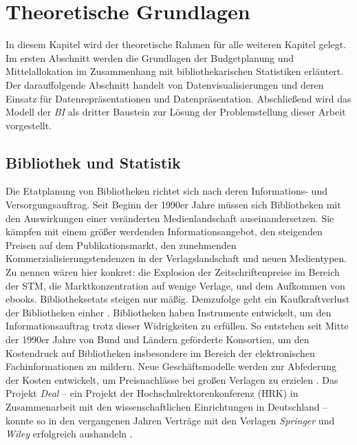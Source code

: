\chapter{Theoretische Grundlagen}
\label{chap:two}
In diesem Kapitel wird der theoretische Rahmen für alle weiteren Kapitel gelegt. Im
ersten Abschnitt werden die Grundlagen der Budgetplanung und Mittelallokation im Zusammenhang mit bibliothekarischen Statistiken erläutert. 
Der darauffolgende Abschnitt handelt von Datenvisualisierungen und deren Einsatz
für Datenrepräsentationen und Datenpräsentation. Abschließend wird das Modell der \textit{\acrlong{BI}} als dritter Baustein zur Lösung der 
Problemstellung dieser Arbeit vorgestellt.

\section{Bibliothek und Statistik}
\label{chap:two_one}
Die Etatplanung von Bibliotheken richtet sich nach deren Informations- und Versorgungsauftrag. 
Seit Beginn der 1990er Jahre müssen sich Bibliotheken mit den Auswirkungen einer veränderten Medienlandschaft auseinandersetzen.
Sie kämpfen mit einem größer werdenden Informationsangebot, den steigenden Preisen auf dem Publikationsmarkt, 
den zunehmenden Kommerzialisierungstendenzen in der Verlagslandschaft und neuen Medientypen. 
Zu nennen wären hier konkret: die Explosion der Zeitschriftenpreise im Bereich der \acrfull{STM}, die Marktkonzentration auf wenige Verlage, 
und dem Aufkommen von ebooks. Bibliotheksetats steigen nur mäßig. 
Demzufolge geht ein Kaufkraftverlust der Bibliotheken einher \cite[vgl.][164 ff.]{moravetz-kuhlmann_monika_erwerbungspolitik_2015}.
Bibliotheken haben Instrumente entwickelt, um den Informationsauftrag trotz dieser Widrigkeiten zu erfüllen.
So entstehen seit Mitte der 1990er Jahre von Bund und Ländern geförderte Konsortien, um den Kostendruck auf Bibliotheken insbesondere im Bereich der elektronischen
Fachinformationen zu mildern. Neue Geschäftsmodelle werden zur Abfederung der Kosten entwickelt, um Preisnachlässe bei großen Verlagen zu erzielen
\cite[vgl.][169 ff.]{moravetz-kuhlmann_monika_erwerbungspolitik_2015}. Das Projekt \textit{Deal} -- ein Projekt der Hochschulrektorenkonferenz (HRK) in Zusammenarbeit mit den
wissenschaftlichen Einrichtungen in Deutschland -- konnte so in den vergangenen Jahren Verträge mit den Verlagen \textit{Springer} und \textit{Wiley} erfolgreich aushandeln \cite[vgl.][]{projekt_deal_projekt_2020}.

